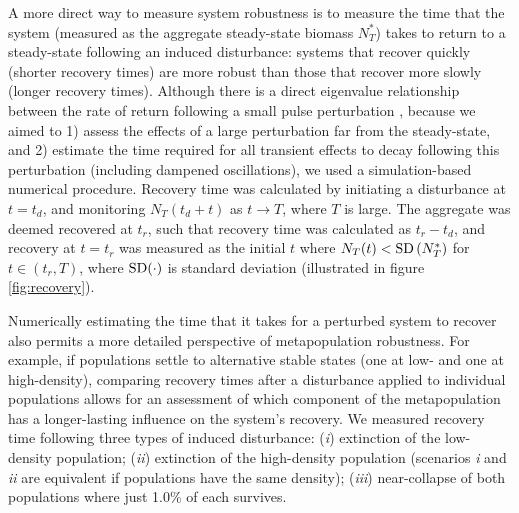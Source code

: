 \documentclass{revtex4}
\begin{document}
A more direct way to measure system robustness is to measure the time that the system (measured as the aggregate steady-state biomass $N_T^*$) takes to return to a steady-state following an induced disturbance: systems that recover quickly (shorter recovery times) are more robust than those that recover more slowly (longer recovery times).
Although there is a direct eigenvalue relationship between the rate of return following a small pulse perturbation \citep{GuckHolmes}, because we aimed to 
1) assess the effects of a large perturbation far from the steady-state, and 
2) estimate the time required for all transient effects to decay following this perturbation (including dampened oscillations), we used a simulation-based numerical procedure.
Recovery time was calculated by initiating a disturbance at $t=t_d$, and monitoring $N_T(t_d+t)$ as $t\rightarrow T$, where $T$ is large. 
The aggregate was deemed recovered at $t_r$, such that recovery time was calculated as $t_r-t_d$, and recovery at $t=t_r$ was measured as the initial $t$ where $N_T(t) < {\rm SD}\left( N_T^* \right)$ for $t\in(t_r,T)$, where $\rm{SD}(\cdot)$ is standard deviation (illustrated in figure \ref{fig:recovery}).


Numerically estimating the time that it takes for a perturbed system to recover also permits a more detailed perspective of metapopulation robustness.
For example, if populations settle to alternative stable states (one at low- and one at high-density), comparing recovery times after a disturbance applied to individual populations allows for an assessment of which component of the metapopulation has a longer-lasting influence on the system's recovery. %
We measured recovery time following three types of induced disturbance: (\emph{i}) extinction of the low-density population; (\emph{ii}) extinction of the high-density population (scenarios \emph{i} and \emph{ii} are equivalent if populations have the same density); (\emph{iii}) near-collapse of both populations where just 1.0\% of each survives.
\\
\end{document}
